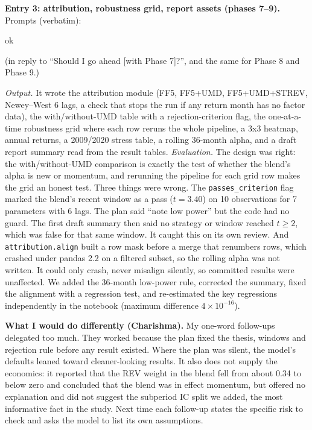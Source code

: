 \textbf{Entry 3: attribution, robustness grid, report assets (phases 7--9).} Prompts (verbatim):
\begin{promptbox}
\noindent ok

\medskip\noindent (in reply to ``Should I go ahead [with Phase 7]?'', and the same for Phase 8 and Phase 9.)
\end{promptbox}
\emph{Output.} It wrote the attribution module (FF5, FF5+UMD, FF5+UMD+STREV, Newey--West 6 lags, a check that stops the run if any return month has no factor data), the with/without-UMD table with a rejection-criterion flag, the one-at-a-time robustness grid where each row reruns the whole pipeline, a 3x3 heatmap, annual returns, a 2009/2020 stress table, a rolling 36-month alpha, and a draft report summary read from the result tables. \emph{Evaluation.} The design was right: the with/without-UMD comparison is exactly the test of whether the blend's alpha is new or momentum, and rerunning the pipeline for each grid row makes the grid an honest test. Three things were wrong. The \texttt{passes\_criterion} flag marked the blend's recent window as a pass ($t=3.40$) on 10 observations for 7 parameters with 6 lags. The plan said ``note low power'' but the code had no guard. The first draft summary then said no strategy or window reached $t\geq2$, which was false for that same window. It caught this on its own review. And \texttt{attribution.align} built a row mask before a merge that renumbers rows, which crashed under pandas 2.2 on a filtered subset, so the rolling alpha was not written. It could only crash, never misalign silently, so committed results were unaffected. We added the 36-month low-power rule, corrected the summary, fixed the alignment with a regression test, and re-estimated the key regressions independently in the notebook (maximum difference $4\times10^{-16}$).

\textbf{What I would do differently (Charishma).} My one-word follow-ups delegated too much. They worked because the plan fixed the thesis, windows and rejection rule before any result existed. Where the plan was silent, the model's defaults leaned toward cleaner-looking results. It also does not supply the economics: it reported that the REV weight in the blend fell from about 0.34 to below zero and concluded that the blend was in effect momentum, but offered no explanation and did not suggest the subperiod IC split we added, the most informative fact in the study. Next time each follow-up states the specific risk to check and asks the model to list its own assumptions.
